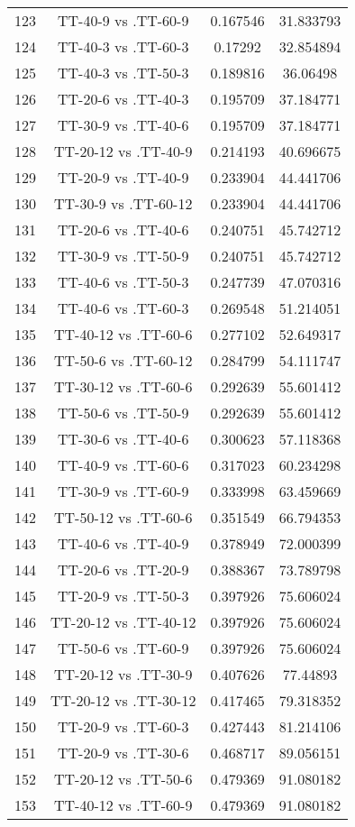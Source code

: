 \documentclass[a4paper,10pt]{article}
\begin{document}
\begin{landscape}
\begin{table}[!htp]
\begin{tabular}{cccc}
123&TT-40-9 vs .TT-60-9&0.167546&31.833793\\
124&TT-40-3 vs .TT-60-3&0.17292&32.854894\\
125&TT-40-3 vs .TT-50-3&0.189816&36.06498\\
126&TT-20-6 vs .TT-40-3&0.195709&37.184771\\
127&TT-30-9 vs .TT-40-6&0.195709&37.184771\\
128&TT-20-12 vs .TT-40-9&0.214193&40.696675\\
129&TT-20-9 vs .TT-40-9&0.233904&44.441706\\
130&TT-30-9 vs .TT-60-12&0.233904&44.441706\\
131&TT-20-6 vs .TT-40-6&0.240751&45.742712\\
132&TT-30-9 vs .TT-50-9&0.240751&45.742712\\
133&TT-40-6 vs .TT-50-3&0.247739&47.070316\\
134&TT-40-6 vs .TT-60-3&0.269548&51.214051\\
135&TT-40-12 vs .TT-60-6&0.277102&52.649317\\
136&TT-50-6 vs .TT-60-12&0.284799&54.111747\\
137&TT-30-12 vs .TT-60-6&0.292639&55.601412\\
138&TT-50-6 vs .TT-50-9&0.292639&55.601412\\
139&TT-30-6 vs .TT-40-6&0.300623&57.118368\\
140&TT-40-9 vs .TT-60-6&0.317023&60.234298\\
141&TT-30-9 vs .TT-60-9&0.333998&63.459669\\
142&TT-50-12 vs .TT-60-6&0.351549&66.794353\\
143&TT-40-6 vs .TT-40-9&0.378949&72.000399\\
144&TT-20-6 vs .TT-20-9&0.388367&73.789798\\
145&TT-20-9 vs .TT-50-3&0.397926&75.606024\\
146&TT-20-12 vs .TT-40-12&0.397926&75.606024\\
147&TT-50-6 vs .TT-60-9&0.397926&75.606024\\
148&TT-20-12 vs .TT-30-9&0.407626&77.44893\\
149&TT-20-12 vs .TT-30-12&0.417465&79.318352\\
150&TT-20-9 vs .TT-60-3&0.427443&81.214106\\
151&TT-20-9 vs .TT-30-6&0.468717&89.056151\\
152&TT-20-12 vs .TT-50-6&0.479369&91.080182\\
153&TT-40-12 vs .TT-60-9&0.479369&91.080182\\

\end{tabular}
\end{table}
\end{landscape}
\end{document}

